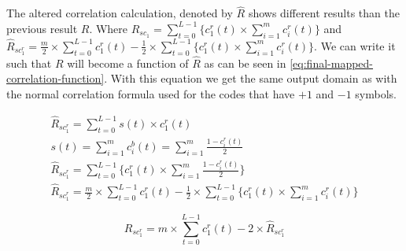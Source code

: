 The altered correlation calculation, denoted by $\hat{R}$ shows different results than the previous result $R$.
Where $R_{sc_{1}} = \displaystyle\sum_{t = 0} ^ {L - 1} \Bigg\{ c^r_1(t) \times  \displaystyle\sum_{i = 1} ^ {m} c^r_i(t) \Bigg\} $ and $\hat{R}_{sc^r_{1}} = \frac{m}{2} \times \displaystyle\sum_{t = 0} ^ {L - 1} c^r_1(t) - \frac{1}{2} \times \displaystyle\sum_{t = 0} ^ {L - 1}  \Bigg\{ c^r_1(t) \times \displaystyle\sum_{i = 1} ^ {m} c^r_i(t) \Bigg\}$.
We can write it such that $R$ will become a function of $\hat{R}$ as can be seen in \autoref{eq:final-mapped-correlation-function}.
With this equation we get the same output domain as with the normal correlation formula used for the codes that have $+1$ and $-1$ symbols.

\begin{equation}
	\begin{array}{l}
		\hat{R}_{sc^r_{1}} = \displaystyle\sum_{t = 0} ^ {L - 1} s(t) \times c^r_1(t)	 \\
		s(t) = \displaystyle\sum_{i = 1} ^ {m} c^b_i(t) = \displaystyle\sum_{i = 1} ^ {m} \frac{1 - c^r_i(t)}{2} \\
		\hat{R}_{sc^r_{1}} = \displaystyle\sum_{t = 0} ^ {L - 1} \Bigg\{  c^r_1(t)	\times \displaystyle\sum_{i = 1} ^ {m} \frac{1 - c^r_i(t)}{2}  	\Bigg\} \\
		\hat{R}_{sc^r_{1}} = \frac{m}{2} \times \displaystyle\sum_{t = 0} ^ {L - 1} c^r_1(t) - \frac{1}{2} \times \displaystyle\sum_{t = 0} ^ {L - 1}  \Bigg\{ c^r_1(t) \times \displaystyle\sum_{i = 1} ^ {m} c^r_i(t) \Bigg\}
	\end{array} 
	\label{eq:eqns-correlation-binary-symbols}
\end{equation}



\begin{equation}
	R_{sc^r_{1}} = m \times \displaystyle\sum_{t = 0} ^ {L - 1} c^r_1(t) - 2 \times \hat{R}_{sc^r_1}
	\label{eq:final-mapped-correlation-function}
\end{equation}


